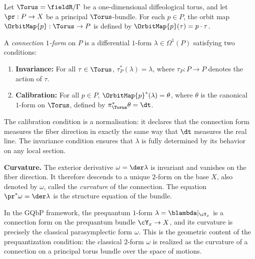 \begin{article}
  \label{art:Connections on Torus Principal Bundles}
  
  Let $\Torus = \fieldR/\Gamma$ be a one-dimensional diffeological torus,
  and let $\pr: P \to X$ be a principal $\Torus$-bundle.
  For each $p \in P$,
  the orbit map $\OrbitMap{p}: \Torus \to P$ is defined by
  $\OrbitMap{p}(\tau) = p \cdot \tau$.
  
  \begin{definition}
    A \emph{connection $1$-form} on $P$ is a differential $1$-form
    $\lambda \in \Omega^1(P)$ satisfying two conditions:
    \begin{enumerate}
      \item \textbf{Invariance:}
      For all $\tau \in \Torus$,
      $\tau_P^*(\lambda) = \lambda$,
      where $\tau_P: P \to P$ denotes the action of $\tau$.
      \item \textbf{Calibration:}
      For all $p \in P$,
      $\OrbitMap{p}^*(\lambda) = \theta$,
      where $\theta$ is the canonical $1$-form on $\Torus$,
      defined by $\pi_\Torus^*\theta = \dt$.
    \end{enumerate}
  \end{definition}
  
  The calibration condition is a normalisation:
  it declares that the connection form measures the fiber direction
  in exactly the same way that $\dt$ measures the real line.
  The invariance condition ensures that $\lambda$ is fully determined
  by its behavior on any local section.
  
  \medskip
  \noindent
  \textbf{Curvature.}
  The exterior derivative $\omega = \der\lambda$ is invariant
  and vanishes on the fiber direction.
  It therefore descends to a unique $2$-form on the base $X$,
  also denoted by $\omega$,
  called the \emph{curvature} of the connection.
  The equation $\pr^*\omega = \der\lambda$ is the structure equation
  of the bundle.
  
  In the GQbP framework,
  the prequantum $1$-form $\lambda = \blambda|_{\cY_x}$ is a connection form
  on the prequantum bundle $\cY_x \to X$,
  and its curvature is precisely the classical parasymplectic form $\omega$.
  This is the geometric content of the prequantization condition:
  the classical $2$-form $\omega$ is realized as the curvature of a connection
  on a principal torus bundle over the space of motions.
\end{article}



